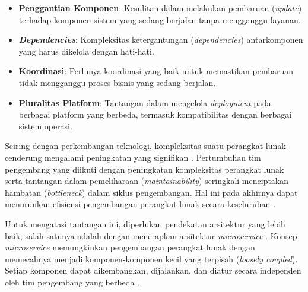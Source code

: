 \begin{itemize}
  \item \textbf{Penggantian Komponen}: Kesulitan dalam melakukan pembaruan (\textit{update}) terhadap komponen sistem yang sedang berjalan tanpa mengganggu layanan.

  \item \textit{\textbf{Dependencies}}: Kompleksitas ketergantungan (\textit{dependencies}) antarkomponen yang harus dikelola dengan hati-hati.

  \item \textbf{Koordinasi}: Perlunya koordinasi yang baik untuk memastikan pembaruan tidak mengganggu proses bisnis yang sedang berjalan.

  \item \textbf{Pluralitas Platform}: Tantangan dalam mengelola \textit{deployment} pada berbagai platform yang berbeda, termasuk kompatibilitas dengan berbagai sistem operasi.
\end{itemize}
\par
Seiring dengan perkembangan teknologi, kompleksitas suatu perangkat lunak
cenderung mengalami peningkatan yang signifikan \cite{Tania2014, Newman2015}.
Pertumbuhan tim pengembang yang diikuti dengan peningkatan kompleksitas
perangkat lunak serta tantangan dalam pemeliharaan (\textit{maintainability})
seringkali menciptakan hambatan (\textit{bottleneck}) dalam siklus
pengembangan. Hal ini pada akhirnya dapat menurunkan efisiensi pengembangan
perangkat lunak secara keseluruhan \cite{Yale2016}.

Untuk mengatasi tantangan ini, diperlukan pendekatan arsitektur yang lebih
baik, salah satunya adalah dengan menerapkan arsitektur \textit{microservice}
\cite{Tania2014}. Konsep \textit{microservice} memungkinkan pengembangan
perangkat lunak dengan memecahnya menjadi komponen-komponen kecil yang terpisah
(\textit{loosely coupled}). Setiap komponen dapat dikembangkan, dijalankan, dan
diatur secara independen oleh tim pengembang yang berbeda \cite{Xiao2017}.

